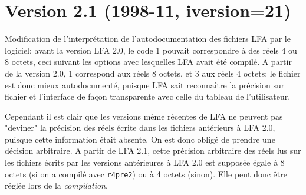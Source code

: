 \documentclass[10pt,french]{book}
\begin{document}
\section*{Version 2.1 (1998-11, iversion=21)}

\p Modification de l'interprétation
de l'autodocumentation des fichiers LFA par le logiciel:
avant la version
LFA 2.0, le code 1 pouvait correspondre à des réels
4 ou 8 octets, ceci suivant les options
avec lesquelles LFA avait été compilé.
A partir de la version 2.0, 1 correspond aux
réels 8 octets, et 3 aux réels 4 octets;
le fichier est donc mieux autodocumenté,
puisque LFA sait reconnaître la précision sur fichier
et l'interface de façon transparente avec celle 
du tableau de l'utilisateur.

\p Cependant il est clair que les versions même
récentes de LFA ne peuvent
pas "deviner" la précision des réels 
écrite dans les fichiers antérieurs à LFA 2.0,
puisque cette information était absente.
On est donc obligé de prendre une décision arbitraire.
A partir de LFA 2.1, cette précision arbitraire
des réels lus sur les fichiers écrits
par les versions antérieures à LFA 2.0 est supposée égale à 8 octets
(si on a compilé avec {\tt r4pre2})
ou à 4 octets (sinon). Elle peut donc être réglée lors de la
{\em compilation}.
\end{document}

